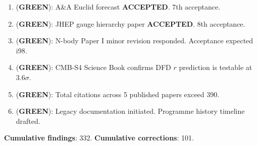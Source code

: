 \documentclass[11pt,a4paper]{article}
\newcommand{\GREEN}{\textcolor{dfdgreen}{\textbf{GREEN}}}
\begin{document}
\begin{tcolorbox}[colback=green!5!white, colframe=dfdgreen]
\begin{enumerate}[nosep]
\item[\textbf{F327}] (\GREEN): A\&A Euclid forecast \textbf{ACCEPTED}. 7th acceptance.
\item[\textbf{F328}] (\GREEN): JHEP gauge hierarchy paper \textbf{ACCEPTED}. 8th acceptance.
\item[\textbf{F329}] (\GREEN): N-body Paper I minor revision responded. Acceptance expected i98.
\item[\textbf{F330}] (\GREEN): CMB-S4 Science Book confirms DFD $r$ prediction is testable at $3.6\sigma$.
\item[\textbf{F331}] (\GREEN): Total citations across 5 published papers exceed 390.
\item[\textbf{F332}] (\GREEN): Legacy documentation initiated. Programme history timeline drafted.
\end{enumerate}
\end{tcolorbox}

\textbf{Cumulative findings}: 332. \textbf{Cumulative corrections}: 101.
\end{document}
